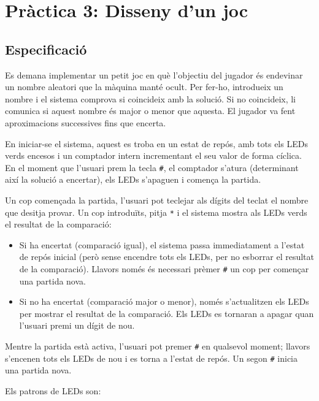 \chapter{Pràctica 3: Disseny d'un joc}

\section{Especificació}

Es demana implementar un petit joc en què l'objectiu del jugador és endevinar un
nombre aleatori que la màquina manté ocult. Per fer-ho, introdueix un nombre i el
sistema comprova si coincideix amb la solució. Si no coincideix, li comunica si
aquest nombre és major o menor que aquesta. El jugador va fent aproximacions
successives fins que encerta.

En iniciar-se el sistema, aquest es troba en un estat de repós, amb tots els LEDs
verds encesos i un comptador intern incrementant el seu valor de forma cíclica.
En el moment que l'usuari prem la tecla \texttt{\#}, el comptador s'atura
(determinant així la solució a encertar), els LEDs s'apaguen i comença la partida.

Un cop començada la partida, l'usuari pot teclejar als dígits del teclat el
nombre que desitja provar. Un cop introduïts, pitja \texttt{*} i el sistema
mostra als LEDs verds el resultat de la comparació:

\begin{itemize}
\item Si ha encertat (comparació igual), el sistema passa immediatament a l'estat
   de repós inicial (però sense encendre tots els LEDs, per no esborrar el resultat
   de la comparació). Llavors només és necessari prèmer \texttt{\#} un cop per
   començar una partida nova.

\item Si no ha encertat (comparació major o menor), només s'actualitzen els LEDs
   per mostrar el resultat de la comparació. Els LEDs es tornaran a apagar quan
   l'usuari premi un dígit de nou.
\end{itemize}

Mentre la partida està activa, l'usuari pot premer \texttt{\#} en qualsevol moment;
llavors s'encenen tots els LEDs de nou i es torna a l'estat de repós. Un segon \texttt{\#}
inicia una partida nova.

Els patrons de LEDs son:

